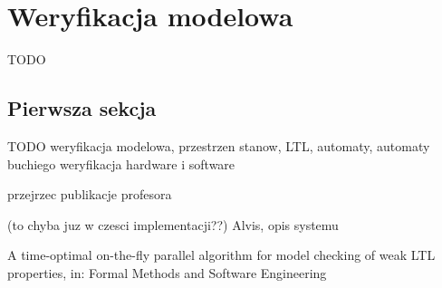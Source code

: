 \chapter{Weryfikacja modelowa}

TODO


\section{Pierwsza sekcja}

TODO
weryfikacja modelowa, przestrzen stanow, LTL, automaty, automaty buchiego
weryfikacja hardware i software

\cite{Bar12} \cite{Jac05}
przejrzec publikacje profesora


(to chyba juz w czesci implementacji??)
Alvis, opis systemu


A time-optimal on-the-fly parallel algorithm for model checking of weak LTL properties, in: Formal Methods and Software Engineering
